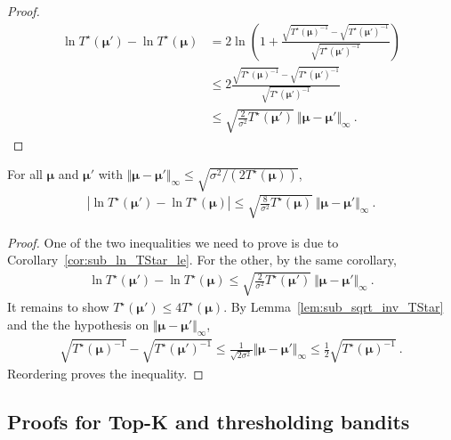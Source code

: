 \begin{proof}
\begin{align*}
\ln T^\star(\bm\mu') - \ln T^\star(\bm\mu)
&= 2 \ln \left( 1 + \frac{\sqrt{T^\star(\bm\mu)^{-1}} - \sqrt{T^\star(\bm\mu')^{-1}}}{\sqrt{T^\star(\bm\mu')^{-1}}} \right)
\\
&\le 2 \frac{\sqrt{T^\star(\bm\mu)^{-1}} - \sqrt{T^\star(\bm\mu')^{-1}}}{\sqrt{T^\star(\bm\mu')^{-1}}}
\\
&\le \sqrt{\frac{2}{\sigma^2}T^\star(\bm\mu')} \ \Vert \bm\mu - \bm\mu' \Vert_\infty
\: .
\end{align*}

\end{proof}


\begin{corollary}\label{cor:abs_sub_ln_TStar_le}
For all $\bm\mu$ and $\bm\mu'$ with $\Vert \bm\mu - \bm\mu' \Vert_\infty \le \sqrt{\sigma^2 / (2 T^\star(\bm\mu))}$,
\begin{align*}
\left\vert \ln T^\star(\bm\mu') - \ln T^\star(\bm\mu) \right\vert
\le \sqrt{\frac{8}{\sigma^2}T^\star(\bm\mu)} \ \Vert \bm\mu - \bm\mu' \Vert_\infty
\: .
\end{align*}
\end{corollary}

\begin{proof}
One of the two inequalities we need to prove is due to Corollary~\ref{cor:sub_ln_TStar_le}. For the other, by the same corollary,
\begin{align*}
\ln T^\star(\bm\mu') - \ln T^\star(\bm\mu)
\le \sqrt{\frac{2}{\sigma^2}T^\star(\bm\mu')} \ \Vert \bm\mu - \bm\mu' \Vert_\infty
\: .
\end{align*}
It remains to show $T^\star(\bm\mu') \le 4 T^\star(\bm\mu)$. By Lemma~\ref{lem:sub_sqrt_inv_TStar} and the the hypothesis on $\Vert \bm\mu - \bm\mu' \Vert_\infty$,
\begin{align*}
\sqrt{T^\star(\bm\mu)^{-1}} - \sqrt{T^\star(\bm\mu')^{-1}}
\le \frac{1}{\sqrt{2\sigma^2}} \Vert \bm\mu - \bm\mu' \Vert_\infty
\le \frac{1}{2}\sqrt{T^\star(\bm\mu)^{-1}} \: .
\end{align*}
Reordering proves the inequality.
\end{proof}



\subsection{Proofs for Top-K and thresholding bandits}
\label{app:topk_threshold}

